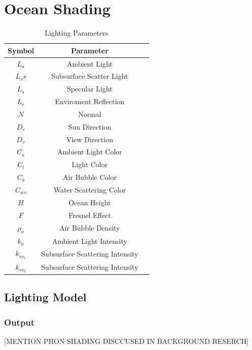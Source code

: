 \section{Ocean Shading}

\begin{table}[H]
    \centering
    \begin{tabular}{|c|c|c|}
        \hline
        \textbf{Symbol} & \textbf{Parameter} \\
        \hline
        $L_a$ & Ambient Light \\
        $L_ss$ & Subsurface Scatter Light\\
        $L_s$ & Specular Light\\
        $L_r$ & Enviroment Reflection\\
        $N$ & Normal \\
        $D_s$ & Sun Direction \\
        $D_v$ & View Direction \\
        $C_a$ & Ambient Light Color \\
        $C_l$ & Light Color \\
        $C_b$ & Air Bubble Color \\
        $C_{ws}$ & Water Scattering Color \\
        $H$ & Ocean Height \\
        $F$ & Fresnel Effect \\
        $\rho_a$ & Air Bubble Density \\
        $k_a$ & Ambient Light Intensity \\
        $k_{ss_1}$ & Subsurface Scattering Intensity \\
        $k_{ss_2}$ & Subsurface Scattering Intensity \\
        \hline
    \end{tabular}
    \caption{Lighting Parameters}
    \label{table:lighting_parameters}
\end{table}

\subsection{Lighting Model}

\subsubsection{Output}
[MENTION PHON SHADING DISCCUSED IN BACKGROUND RESERCH]


